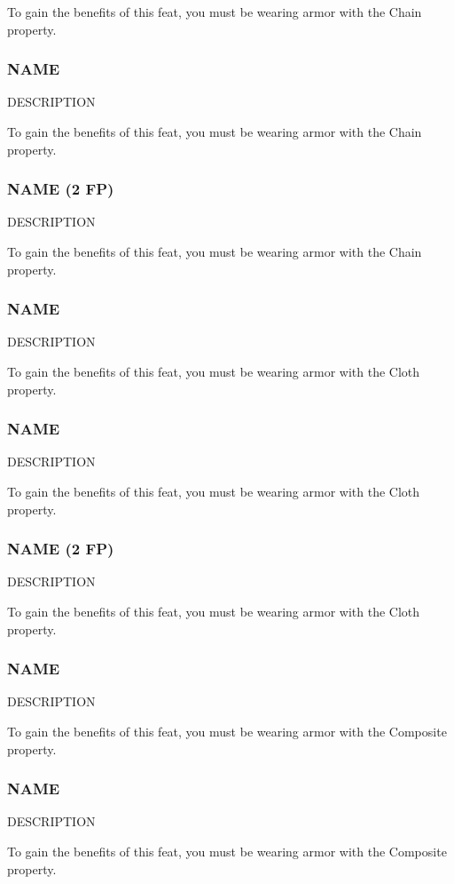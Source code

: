     To gain the benefits of this feat, you must be wearing armor with the Chain property.
\subsubsection{NAME} \label{feat::name}
    DESCRIPTION

    To gain the benefits of this feat, you must be wearing armor with the Chain property.
\subsubsection{NAME (2 FP)} \label{feat::name}
    DESCRIPTION

    To gain the benefits of this feat, you must be wearing armor with the Chain property.
\subsubsection{NAME} \label{feat::name}
    DESCRIPTION

    To gain the benefits of this feat, you must be wearing armor with the Cloth property.
\subsubsection{NAME} \label{feat::name}
    DESCRIPTION

    To gain the benefits of this feat, you must be wearing armor with the Cloth property.
\subsubsection{NAME (2 FP)} \label{feat::name}
    DESCRIPTION

    To gain the benefits of this feat, you must be wearing armor with the Cloth property.
\subsubsection{NAME} \label{feat::name}
    DESCRIPTION

    To gain the benefits of this feat, you must be wearing armor with the Composite property.
\subsubsection{NAME} \label{feat::name}
    DESCRIPTION

    To gain the benefits of this feat, you must be wearing armor with the Composite property.
